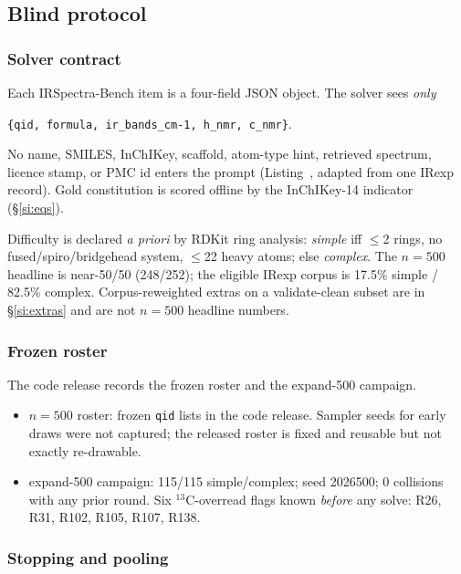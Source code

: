 \subsection{Blind protocol}
\label{si:protocol}

\subsubsection{Solver contract}

Each IRSpectra-Bench item is a four-field JSON object. The solver sees
\emph{only}
\begin{center}
\texttt{\{qid, formula, ir\_bands\_cm-1, h\_nmr, c\_nmr\}}.
\end{center}
No name, SMILES, InChIKey, scaffold, atom-type hint, retrieved spectrum,
licence stamp, or PMC id enters the prompt
(Listing~, adapted from one IRexp record).
Gold constitution is scored offline by the InChIKey-14 indicator
(\S\ref{si:eqs}).

Difficulty is declared \emph{a priori} by RDKit ring analysis:
\emph{simple} iff $\leq$2 rings, no fused/spiro/bridgehead system,
$\leq$22 heavy atoms; else \emph{complex}.
The $n{=}500$ headline is near-50/50 (248/252);
the eligible IRexp corpus is 17.5\% simple / 82.5\% complex.
Corpus-reweighted extras on a validate-clean subset are in
\S\ref{si:extras} and are not $n{=}500$ headline numbers.

\subsubsection{Frozen roster}

The code release records the frozen roster and the expand-500 campaign.

\begin{itemize}
  \item $n{=}500$ roster: frozen \texttt{qid} lists in the code release.
        Sampler seeds for early draws were not captured; the released
        roster is fixed and reusable but not exactly re-drawable.
  \item expand-500 campaign: 115/115 simple/complex; seed 2026500;
        0 collisions with any prior round.
        Six $^{13}$C-overread flags known \emph{before} any solve:
        R26, R31, R102, R105, R107, R138.
\end{itemize}

\subsubsection{Stopping and pooling}
\label{si:stopping}


